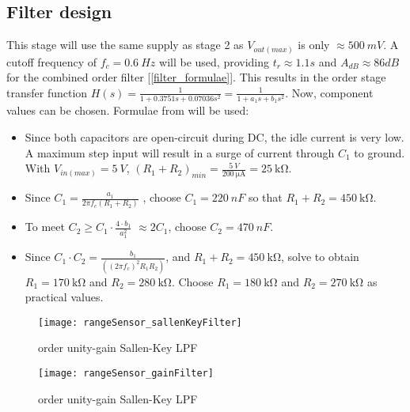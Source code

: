 \subsection{Filter design}

This stage will use the same supply as stage 2 as $V_{out(max)}$ is only $\approx \SI{500}{mV}$.
A cutoff frequency of $f_c = \SI{0.6}{Hz}$ will be used, providing $t_r \approx 1.1 s$ and $A_{dB} \approx 86 dB $ for the combined  order filter [\ref{filter_formulae}].
This results in the  order stage transfer function $H(s) = \frac{1}{1 + 0.3751 s + 0.07036 s^2} = \frac{1}{1 + a_1 s + b_1 s^2}$. Now, component values can be chosen.
Formulae from \cite{filterDesign} will be used:

\begin{itemize}
  \item Since both capacitors are open-circuit during DC, the idle current is very low. A maximum step input will result in a surge of current through $C_1$ to ground.
        With $V_{in(max)} = \SI{5}{V}$, $(R_1 + R_2)_{min} = \frac{\SI{5}{V}}{\SI{200}{\micro\ampere}} = \SI{25}{\kilo\ohm}$.
  \item Since $C_1 = \frac{a_1}{2 \pi f_c (R_1 + R_2)}$ \cite{filterDesign}, choose $C_1 = \SI{220}{nF}$ so that $R_1 + R_2 = \SI{450}{\kilo\ohm}$.
  \item To meet $C_2 \geq C_1 \cdot \frac{4 \cdot b_1}{a_1 ^2} $\cite{filterDesign} $\approx 2 C_1 $, choose $C_2 = \SI{470}{nF}$.
  \item Since $C_1 \cdot C_2 = \frac{b_1}{((2 \pi f_c)^2 R_1 R_2)}$, and $R_1 + R_2 = \SI{450}{\kilo\ohm}$, solve to obtain $R_1 = \SI{170}{\kilo\ohm}$ and $R_2 = \SI{280}{\kilo\ohm}$.
        Choose $R_1 = \SI{180}{\kilo\ohm}$ and $R_2 = \SI{270}{\kilo\ohm}$ as practical values.
\end{itemize}

\begin{figure}[!htb]
  \centering
  \begin{minipage}{.4\textwidth}
    \centering
    \texttt{[image: rangeSensor\_sallenKeyFilter]}
    \caption{ order unity-gain Sallen-Key LPF \cite{filterDesign}}
    \label{fig:sallenKeyFilter}
  \end{minipage}
  \begin{minipage}{.4\textwidth}
    \centering
    \texttt{[image: rangeSensor\_gainFilter]}
    \caption{ order unity-gain Sallen-Key LPF \cite{gainOffset30Seconds}}
    \label{fig:sallenKeyFilter}
  \end{minipage}
\end{figure}


